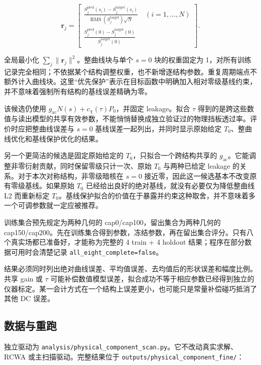 \documentclass[
  chinese,
  UTF8,
  a4paper,
  11pt]{ctexart}
\begin{document}
\[
\mathbf r_j=
\begin{bmatrix}
\displaystyle
\frac{S_j^{\mathrm{pred}}(s_i)-S_j^{\mathrm{target}}(s_i)}
{\operatorname{RMS}(S_j^{\mathrm{target}})\sqrt{N}}\quad (i=1,\ldots,N)\\[6pt]
\displaystyle
\frac{S_j^{\mathrm{pred}}(0)-S_j^{\mathrm{target}}(0)}{S_j^{\mathrm{target}}(0)}
\end{bmatrix}.
\]

全局最小化 \(\sum_j\|\mathbf r_j\|^2\)。整曲线块与单个 \(s=0\)
块的权重固定为
1，对所有训练记录完全相同；不依据某个结构调整权重，也不新增逐结构参数。重复周期端点不额外计入曲线块。这里``优先保护''表示在目标函数中明确加入相对零级基线约束，并不意味着强制所有结构的基线误差精确为零。

该候选仍使用 \(g_{\mathrm{ac}}N(s)+c_\chi(\tau)P_0\)，并固定
leakage。拟合 \(\tau\)
得到的是跨这些数值与读出模型的共享有效参数，不能悄悄替换成独立验证过的物理挡板透过率。评价时应把整曲线误差与
\(s=0\) 基线误差一起列出，并同时显示原始给定
\(T_0\)、整曲线优化和基线保护优化的结果。

另一个更简洁的候选是固定原始给定的 \(T_0\)，只拟合一个跨结构共享的
\(g_{\mathrm{ac}}\)。它能调整非零衍射贡献，同时保留零级只计一次、原始
\(T_0\) 与两种已给定 leakage 的关系。对于本次对称结构，非零级暗核在
\(s=0\) 接近零，因此这一候选基本不改变原有零级基线。如果原始 \(T_0\)
已经给出良好的绝对基线，就没有必要仅为降低整曲线 L2 而重新标定
\(T_0\)。基线保护拟合的价值在于暴露并约束这种取舍，并不意味着多一个可调参数就一定应被推荐。

训练集合预先规定为两种几何的 cap0/cap100，留出集合为两种几何的
cap150/cap200。先在训练集合得到参数，冻结参数，再在留出集合评分。只有八个真实场都已准备好，才能称为完整的
4 train + 4 holdout 结果；程序在部分数据可用时会清楚记录
\texttt{all\_eight\_complete=false}。

结果必须同时列出绝对曲线误差、平均值误差、去均值后的形状误差和幅度比例。共享
gain 或 \(\tau\)
可能补偿数值模型误差，拟合成功不等于相应参数已经得到独立的仪器标定。某一会计方式在一个结构上误差更小，也可能只是常量补偿碰巧抵消了其他
DC 误差。

\subsection{数据与重跑}\label{ux6570ux636eux4e0eux91cdux8dd1}

独立驱动为
\texttt{analysis/physical\_component\_scan.py}。它不改动真实求解、RCWA
或主扫描驱动。完整结果位于 \texttt{outputs/physical\_component\_fine/}：
\end{document}
